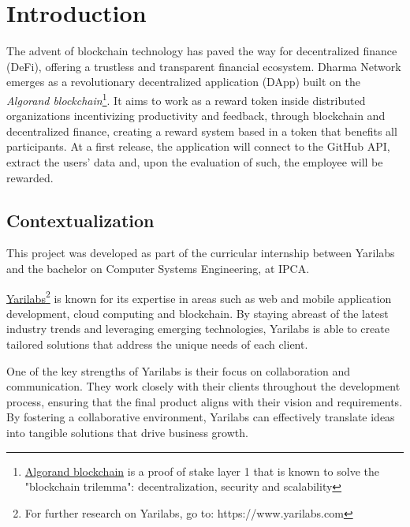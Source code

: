 \chapter{Introduction} \label{chap:intro}

The advent of blockchain technology has paved the way for decentralized finance (DeFi), offering a trustless and transparent financial ecosystem. Dharma Network emerges as a revolutionary decentralized application (DApp) built on the \textit{Algorand blockchain}\footnote{\href{https://developer.algorand.org}{Algorand blockchain} is a proof of stake layer 1 that is known to solve the "blockchain trilemma": decentralization, security and scalability}. \newline
It aims to work as a reward token inside distributed organizations incentivizing productivity and feedback, through blockchain and decentralized finance, creating a reward system based in a token that benefits all participants.\newline
At a first release, the application will connect to the GitHub API, extract the users' data and, upon the evaluation of such, the employee will be rewarded. 

\section{Contextualization} \label{sec:context}


This project was developed as part of the curricular internship between Yarilabs and the bachelor on Computer Systems Engineering, at IPCA.\newline

\href{https://www.yarilabs.com}{Yarilabs}\footnote{For further research on Yarilabs, go to: https://www.yarilabs.com} is known for its expertise in areas such as web and mobile application development, cloud computing and blockchain. By staying abreast of the latest industry trends and leveraging emerging technologies, Yarilabs is able to create tailored solutions that address the unique needs of each client.\newline

One of the key strengths of Yarilabs is their focus on collaboration and communication. They work closely with their clients throughout the development process, ensuring that the final product aligns with their vision and requirements. By fostering a collaborative environment, Yarilabs can effectively translate ideas into tangible solutions that drive business growth.\newline

